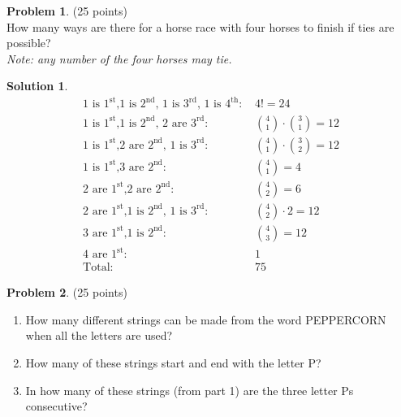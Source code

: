 \documentclass{article}
\theoremstyle{definition}
\newtheorem{problem}{Problem}
\newtheorem*{solution}{Solution}
\begin{document}
\newpage

\begin{problem} (25 points)\\
How many ways are there for a horse race with four horses to finish if ties are possible?\\
\textit{Note: any number of the four horses may tie.}
\end{problem}

\begin{solution}\ \\
  \begin{align*}
    \text{1 is $1^{\text{st}}$,1 is $2^\text{nd}$, 1 is $3^{\text{rd}}$, 1 is $4^{\text{th}}$: }& 4! = 24 \\
    \text{1 is $1^{\text{st}}$,1 is $2^\text{nd}$, 2 are $3^{\text{rd}}$: }& {4 \choose 1} \cdot {3 \choose 1} = 12  \\
    \text{1 is $1^{\text{st}}$,2 are $2^\text{nd}$, 1 is $3^{\text{rd}}$: }&  {4 \choose 1} \cdot {3 \choose 2} = 12\\
    \text{1 is $1^{\text{st}}$,3 are $2^\text{nd}$: }& {4\choose 1} = 4  \\
    \text{2 are $1^{\text{st}}$,2 are $2^\text{nd}$: }& {4 \choose 2} = 6 \\
    \text{2 are $1^{\text{st}}$,1 is $2^\text{nd}$, 1 is $3^{\text{rd}}$: }& {4 \choose 2} \cdot 2 = 12 \\
    \text{3 are $1^{\text{st}}$,1 is $2^\text{nd}$: }& {4 \choose 3} = 12 \\
    \text{4 are $1^{\text{st}}$: }& 1 \\
    \text{Total: }& 75
  \end{align*}
\end{solution}

\newpage

\begin{problem} (25 points)
\begin{enumerate}
\item 
How many different strings can be made from the word PEPPERCORN when all the letters are used?

\item
How many of these strings start and end with the letter P?

\item
In how many of these strings (from part 1) are the three letter Ps consecutive?
\end{enumerate}
\end{problem}
\end{document}
